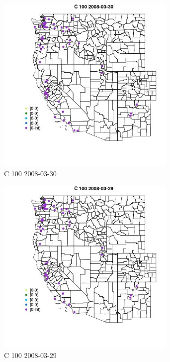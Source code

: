 \begin{figure} 
\centering  
\includegraphics[width=0.77\textwidth]{Code_Outputs/Report_ML_input_PM25_Step4_part_e_de_duplicated_aves_MapObsC_1002008-03-30.jpg} 
\caption{\label{fig:Report_ML_input_PM25_Step4_part_e_de_duplicated_avesMapObsC_1002008-03-30}C 100 2008-03-30} 
\end{figure} 
 

\begin{figure} 
\centering  
\includegraphics[width=0.77\textwidth]{Code_Outputs/Report_ML_input_PM25_Step4_part_e_de_duplicated_aves_MapObsC_1002008-03-29.jpg} 
\caption{\label{fig:Report_ML_input_PM25_Step4_part_e_de_duplicated_avesMapObsC_1002008-03-29}C 100 2008-03-29} 
\end{figure} 
 

